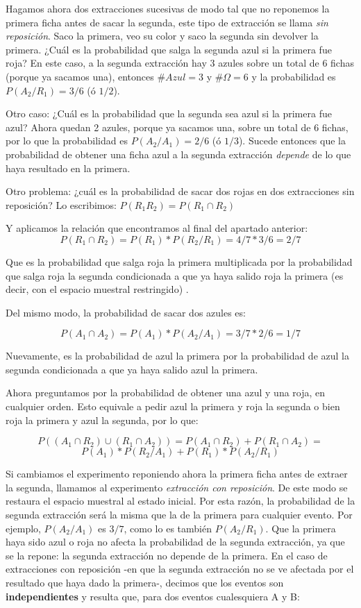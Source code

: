 \documentclass[]{book}
\begin{document}
Hagamos ahora dos extracciones sucesivas de modo tal que no reponemos la primera ficha antes de sacar la segunda, este tipo de extracción se llama \emph{sin reposición}. Saco la primera, veo su color y saco la segunda sin devolver la primera. ¿Cuál es la probabilidad que salga la segunda azul si la primera fue roja? En este caso, a la segunda extracción hay 3
azules sobre un total de 6 fichas (porque ya sacamos una), entonces \(\#Azul = 3\) y \(\#\Omega = 6\) y la probabilidad es \(P(A_{2}/R_{1}) = 3/6\) (ó \(1/2\)).

Otro caso: ¿Cuál es la probabilidad que la segunda sea azul si la
primera fue azul? Ahora quedan 2 azules, porque ya sacamos una, sobre un total de 6 fichas, por lo que la probabilidad es \(P(A_{2}/A_{1}) = 2/6\) (ó \(1/3\)). Sucede entonces que la probabilidad de obtener una ficha azul a la segunda extracción \emph{depende} de lo que haya resultado en la primera.

Otro problema: ¿cuál es la probabilidad de sacar dos rojas en dos
extracciones sin reposición? Lo escribimos: \(P(R_{1}R_{2}) = P(R_{1}\cap R_{2})\)

Y aplicamos la relación que encontramos al final del apartado anterior:
\[P(R_{1}\cap R_{2}) = P(R_{1})*P(R_{2}/R_{1})=4/7*3/6=2/7\]

Que es la probabilidad que salga roja la primera multiplicada por la
probabilidad que salga roja la segunda condicionada a que ya haya salido roja la primera (es decir, con el espacio muestral restringido) .

Del mismo modo, la probabilidad de sacar dos azules es:

\[P(A_{1}\cap A_{2}) = P(A_{1})*P(A_{2}/A_{1})=3/7*2/6=1/7\]

Nuevamente, es la probabilidad de azul la primera por la probabilidad de azul la segunda condicionada a que ya haya salido azul la primera.

Ahora preguntamos por la probabilidad de obtener una azul y una roja, en cualquier orden. Esto equivale a pedir azul la primera y roja la segunda o bien roja la primera y azul la segunda, por lo que:

\[P((A_{1}\cap R_{2})\cup(R_{1}\cap A_{2}))=P(A_{1} \cap R_{2})+P(R_{1} \cap A_{2}) =\]
\[P(A_{1})*P(R_{2}/A_{1})+P(R_{1})*P(A_{2}/R_{1})\]

Si cambiamos el experimento reponiendo ahora la primera ficha antes de extraer la segunda, llamamos al experimento \emph{extracción con reposición}. De este modo se restaura el espacio muestral al estado inicial. Por esta razón, la probabilidad de la segunda extracción será la misma que la de la primera para cualquier evento. Por ejemplo, \(P(A_{2}/A_{1})\) es \(3/7\), como lo es también \(P(A_{2}/R_{1})\). Que la primera haya sido azul o roja no afecta la probabilidad de la segunda extracción, ya que se la repone: la segunda extracción no depende de la primera. En el caso de extracciones con reposición -en que la segunda extracción no se ve afectada por el resultado que haya dado la primera-, decimos que los eventos son \textbf{independientes} y resulta que, para dos eventos cualesquiera A y B:
\end{document}
